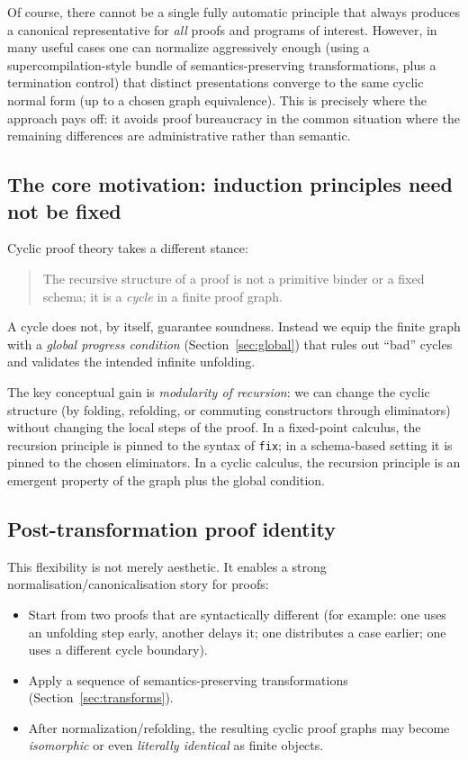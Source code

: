 Of course, there cannot be a single fully automatic principle that always produces a canonical representative for \emph{all} proofs and programs of interest.
However, in many useful cases one can normalize aggressively enough (using a supercompilation-style bundle of semantics-preserving transformations, plus a termination control) that distinct presentations converge to the same cyclic normal form (up to a chosen graph equivalence).
This is precisely where the approach pays off: it avoids proof bureaucracy in the common situation where the remaining differences are administrative rather than semantic.

\subsection{The core motivation: induction principles need not be fixed}

Cyclic proof theory takes a different stance:
\begin{quote}
The recursive structure of a proof is not a primitive binder or a fixed schema; it is a \emph{cycle} in a finite proof graph.
\end{quote}

A cycle does not, by itself, guarantee soundness.
Instead we equip the finite graph with a \emph{global progress condition} (Section~\ref{sec:global}) that rules out ``bad'' cycles and validates the intended infinite unfolding.

The key conceptual gain is \emph{modularity of recursion}:
we can change the cyclic structure (by folding, refolding, or commuting constructors through eliminators) without changing the local steps of the proof.
In a fixed-point calculus, the recursion principle is pinned to the syntax of \texttt{fix}; in a schema-based setting it is pinned to the chosen eliminators.
In a cyclic calculus, the recursion principle is an emergent property of the graph plus the global condition.

\subsection{Post-transformation proof identity}

This flexibility is not merely aesthetic.
It enables a strong normalisation/canonicalisation story for proofs:
\begin{itemize}
\item Start from two proofs that are syntactically different (for example: one uses an unfolding step early, another delays it; one distributes a case earlier; one uses a different cycle boundary).
\item Apply a sequence of semantics-preserving transformations (Section~\ref{sec:transforms}).
\item After normalization/refolding, the resulting cyclic proof graphs may become \emph{isomorphic} or even \emph{literally identical} as finite objects.
\end{itemize}

